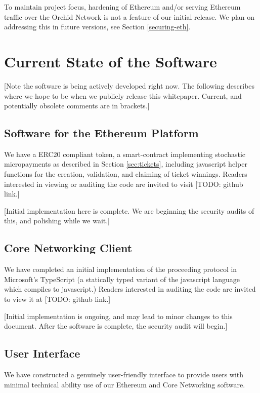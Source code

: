 \documentclass{article}
\newcommand{\orchid}{Orchid}
\newcommand{\Orchid}{\orchid}
\begin{document}
To maintain project focus, hardening of Ethereum and/or serving
Ethereum traffic over the \Orchid{} Network is not a feature of our
initial release. We plan on addressing this in future versions, see
Section \ref{securing-eth}.

\section{Current State of the Software}
\label{sec:current}

[Note the software is being actively developed right now. The
  following describes where we hope to be when we publicly release
  this whitepaper. Current, and potentially obsolete comments are in
  brackets.]

\subsection{Software for the Ethereum Platform}

We have a ERC20 compliant token, a smart-contract implementing
stochastic micropayments as described in Section \ref{sec:tickets},
including javascript helper functions for the creation, validation,
and claiming of ticket winnings. Readers interested in viewing or
auditing the code are invited to visit [TODO: github link.]

[Initial implementation here is complete. We are beginning the
  security audits of this, and polishing while we wait.]

\subsection{Core Networking Client}

We have completed an initial implementation of the proceeding protocol
in Microsoft's TypeScript (a statically typed variant of the
javascript language which compiles to javascript.) Readers interested
in auditing the code are invited to view it at [TODO: github link.]

[Initial implementation is ongoing, and may lead to minor changes to
  this document. After the software is complete, the security audit
  will begin.]

\subsection{User Interface}

We have constructed a genuinely user-friendly interface to provide
users with minimal technical ability use of our Ethereum and Core
Networking software.
\end{document}
